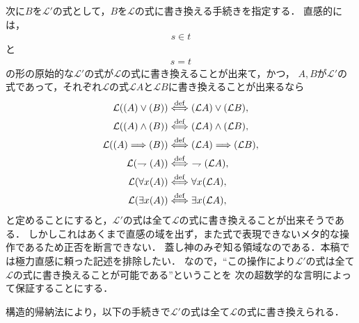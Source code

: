 	次に$B$を$\mathcal{L}'$の式として，$B$を$\mathcal{L}$の式に書き換える手続きを指定する．
	直感的には，
	\begin{align}
		s \in t
	\end{align}
	と
	\begin{align}
		s = t
	\end{align}
	の形の原始的な$\mathcal{L}'$の式が$\mathcal{L}$の式に書き換えることが出来て，かつ，
	$A,B$が$\mathcal{L}'$の式であって，それぞれ$\mathcal{L}$の式$\mathcal{L}A$と$\mathcal{L}B$に書き換えることが出来るなら
	\begin{align}
		\mathcal{L}((A) \vee (B)) &\defarrow (\mathcal{L}A) \vee (\mathcal{L}B), \\
		\mathcal{L}((A) \wedge (B)) &\defarrow (\mathcal{L}A) \wedge (\mathcal{L}B), \\
		\mathcal{L}((A) \Longrightarrow (B)) &\defarrow (\mathcal{L}A) \Longrightarrow (\mathcal{L}B), \\
		\mathcal{L}(\rightharpoondown (A)) &\defarrow\ \rightharpoondown (\mathcal{L}A), \\
		\mathcal{L}(\forall x (A)) &\defarrow \forall x (\mathcal{L}A), \\
		\mathcal{L}(\exists x (A)) &\defarrow \exists x (\mathcal{L}A), \\
	\end{align}
	と定めることにすると，$\mathcal{L}'$の式は全て$\mathcal{L}$の式に書き換えることが出来そうである．
	しかしこれはあくまで直感の域を出ず，また式で表現できないメタ的な操作であるため正否を断言できない．
	蓋し神のみぞ知る領域なのである．本稿では極力直感に頼った記述を排除したい．
	なので，``この操作により$\mathcal{L}'$の式は全て$\mathcal{L}$の式に書き換えることが可能である''ということを
	次の超数学的な言明によって保証することにする．
	
	\begin{screen}
		\begin{metaaxm}[構造的帰納法]
			
		\end{metaaxm}
	\end{screen}
	
	構造的帰納法により，以下の手続きで$\mathcal{L}'$の式は全て$\mathcal{L}$の式に書き換えられる．
	
